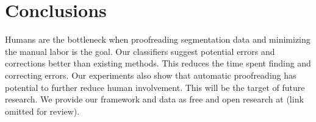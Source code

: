 \section{Conclusions}

Humans are the bottleneck when proofreading segmentation data and minimizing the manual labor is the goal. Our classifiers suggest potential errors and corrections better than existing methods. This reduces the time spent finding and correcting errors.
Our experiments also show that automatic proofreading has potential to further reduce human involvement. This will be the target of future research. We provide our framework and data as free and open research at (link omitted for review).